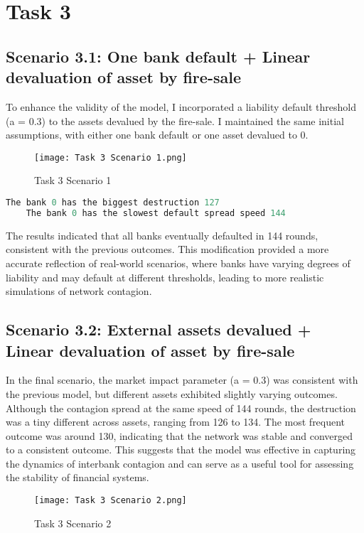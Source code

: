 \section{Task 3}



\subsection{Scenario 3.1: One bank default + Linear devaluation of asset by fire-sale}
To enhance the validity of the model, I incorporated a liability default threshold (a = 0.3) to the assets devalued by the fire-sale. I maintained the same initial assumptions, with either one bank default or one asset devalued to 0. 
\begin{figure}[H]
    \centering
    \texttt{[image: Task 3 Scenario 1.png]}
    \caption{Task 3 Scenario 1}\label{fig:Task 3 Scenario 1}
\end{figure}

\begin{lstlisting}[language=python]
    The bank 0 has the biggest destruction 127
    The bank 0 has the slowest default spread speed 144
\end{lstlisting}

The results indicated that all banks eventually defaulted in 144 rounds, consistent with the previous outcomes. This modification provided a more accurate reflection of real-world scenarios, where banks have varying degrees of liability and may default at different thresholds, leading to more realistic simulations of network contagion.

\subsection{Scenario 3.2: External assets devalued + Linear devaluation of asset by fire-sale}
In the final scenario, the market impact parameter (a = 0.3) was consistent with the previous model, but different assets exhibited slightly varying outcomes. Although the contagion spread at the same speed of 144 rounds, the destruction was a tiny different across assets, ranging from 126 to 134. The most frequent outcome was around 130, indicating that the network was stable and converged to a consistent outcome. This suggests that the model was effective in capturing the dynamics of interbank contagion and can serve as a useful tool for assessing the stability of financial systems.
\begin{figure}[H]
    \centering
    \texttt{[image: Task 3 Scenario 2.png]}
    \caption{Task 3 Scenario 2}\label{fig:Task 3 Scenario 2}
\end{figure}


